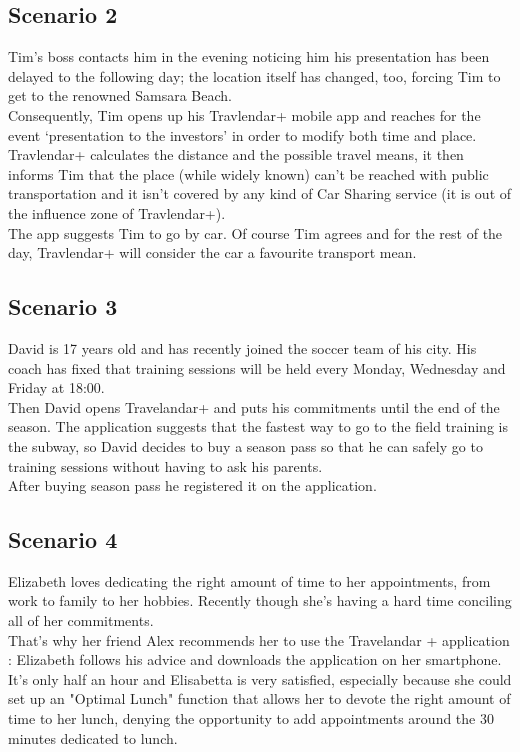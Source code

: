 \subsection{Scenario 2}

Tim’s boss contacts him in the evening noticing him his presentation has been delayed to the following day; the location itself has changed, too, forcing Tim to get to the renowned Samsara Beach.\\
Consequently, Tim opens up his Travlendar+ mobile app and reaches for the event ‘presentation to the investors’ in order to modify both time and place.\\
Travlendar+ calculates the distance and the possible travel means, it then informs Tim that the place (while widely known) can’t be reached with public transportation and it isn’t covered by any kind of Car Sharing service (it is out of the influence zone of Travlendar+).\\
The app suggests Tim to go by car. Of course Tim agrees and for the rest of the day, Travlendar+ will consider the car a favourite transport mean.

\subsection{Scenario 3}

David is 17 years old and has recently joined the soccer team of his city. His coach has fixed that training sessions will be held every Monday, Wednesday and Friday at 18:00.\\
Then David opens Travelandar+ and puts his commitments until the end of the season. The application suggests that the fastest way to go to the field training is the subway, so David decides to buy a season pass so that he can safely go to training sessions without having to ask his parents.\\
After buying season pass he registered it on the application.

\subsection{Scenario 4}

Elizabeth loves dedicating the right amount of time to her appointments, from work to family to her hobbies. Recently though she’s having a hard time conciling all of her commitments.\\ 
That’s why her friend Alex recommends her to use the Travelandar + application : Elizabeth follows his advice and downloads the application on her smartphone.\\
It’s only half an hour and Elisabetta is very satisfied, especially because she could set up an "Optimal Lunch" function that allows her to devote the right amount of time to her lunch, denying the opportunity to add appointments around the 30 minutes dedicated to lunch.


